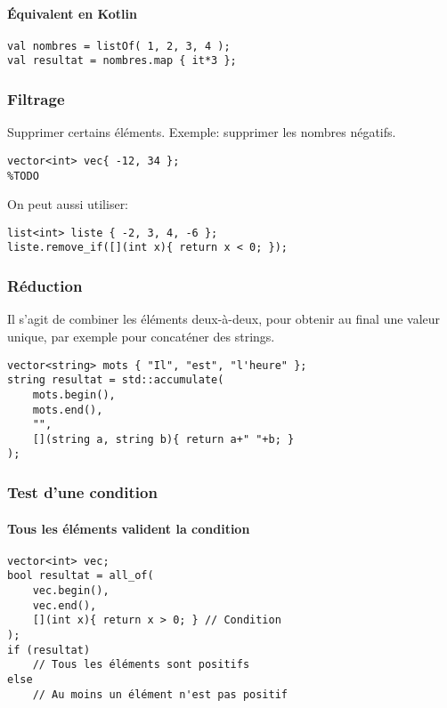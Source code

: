 \documentclass[10pt,a4paper,french]{article}
\begin{document}
\paragraph{Équivalent en Kotlin}
\begin{verbatim}
val nombres = listOf( 1, 2, 3, 4 );
val resultat = nombres.map { it*3 };
\end{verbatim}

\subsubsection{Filtrage}

Supprimer certains éléments. Exemple: supprimer les nombres négatifs.

\begin{verbatim}
vector<int> vec{ -12, 34 };
%TODO
\end{verbatim}

On peut aussi utiliser:
\begin{verbatim}
list<int> liste { -2, 3, 4, -6 };
liste.remove_if([](int x){ return x < 0; });
\end{verbatim}

\subsubsection{Réduction}

Il s'agit de combiner les éléments deux-à-deux, pour obtenir au final une valeur unique, par exemple pour concaténer des strings.

\begin{verbatim}
vector<string> mots { "Il", "est", "l'heure" };
string resultat = std::accumulate(
    mots.begin(),
    mots.end(),
    "",
    [](string a, string b){ return a+" "+b; }
);
\end{verbatim}

\subsubsection{Test d'une condition}

\paragraph{Tous les éléments valident la condition}
\begin{verbatim}
vector<int> vec;
bool resultat = all_of(
    vec.begin(),
    vec.end(),
    [](int x){ return x > 0; } // Condition
);
if (resultat)
    // Tous les éléments sont positifs
else
    // Au moins un élément n'est pas positif
\end{verbatim}
\end{document}

